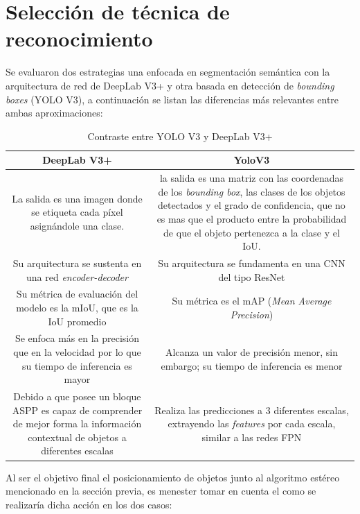 \section{Selección de técnica de reconocimiento}\label{tecnica_recog}
Se evaluaron dos estrategias una enfocada en segmentación semántica con la arquitectura de red de DeepLab V3+ y otra basada en detección de \textit{bounding boxes} (YOLO V3), a continuación se listan las diferencias más relevantes entre ambas aproximaciones:
\begin{table}[H]
\renewcommand{\arraystretch}{1.5}
\centering
\caption{Contraste entre YOLO V3 y DeepLab V3+}
\label{deeplab_vs_yolo}
\begin{tabular}{|c|c|}
\hline
DeepLab V3+ & YoloV3 \\ \hline
\multicolumn{1}{|p{7cm}|}{La salida es una imagen donde se etiqueta cada píxel asignándole una clase.} & \multicolumn{1}{|p{7cm}|}{la salida es una matriz con las coordenadas de los \textit{bounding box}, las clases de los objetos detectados y el grado de confidencia, que no es mas que el producto entre la probabilidad de que el objeto pertenezca a la clase y el IoU.} \\ \hline
\multicolumn{1}{|p{7cm}|}{Su arquitectura se sustenta en una red \textit{encoder-decoder}} & \multicolumn{1}{|p{7cm}|}{Su arquitectura se fundamenta en una CNN del tipo ResNet} \\ \hline
\multicolumn{1}{|p{7cm}|}{Su métrica de evaluación del modelo es la mIoU, que es la IoU promedio} & \multicolumn{1}{|p{7cm}|}{Su métrica es el mAP (\textit{Mean Average Precision})} \\ \hline
\multicolumn{1}{|p{7cm}|}{Se enfoca más en la precisión que en la velocidad por lo que su tiempo de inferencia es mayor} & \multicolumn{1}{|p{7cm}|}{Alcanza un valor de precisión menor, sin embargo; su tiempo de inferencia es menor} \\ \hline
\multicolumn{1}{|p{7cm}|}{Debido a que posee un bloque ASPP es capaz de comprender de mejor forma la información contextual de objetos a diferentes escalas} & \multicolumn{1}{|p{7cm}|}{Realiza las predicciones a 3 diferentes escalas, extrayendo las \textit{features} por cada escala, similar a las redes FPN \cite{FPN} }\\ \hline
\end{tabular}
\end{table}
Al ser el objetivo final el posicionamiento de objetos junto al algoritmo estéreo mencionado en la sección previa, es menester tomar en cuenta el como se realizaría dicha acción en los dos casos:
